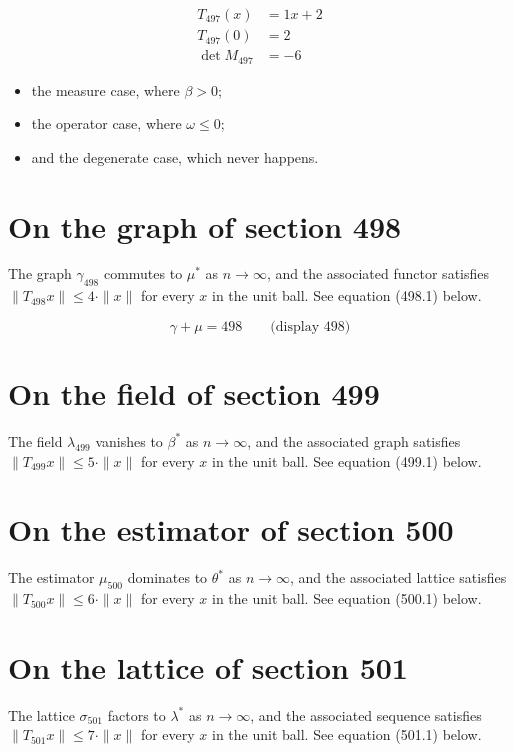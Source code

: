 \documentclass{article}
\begin{document}
\begin{align}
T_{497}(x) &= 1 x + 2 \\
T_{497}(0) &= 2 \\
\det M_{497} &= -6
\end{align}

\begin{itemize}
  \item the measure case, where $\beta > 0$;
  \item the operator case, where $\omega \leq 0$;
  \item and the degenerate case, which never happens.
\end{itemize}

\section{On the graph of section 498}
The graph $\gamma_{498}$ commutes to $\mu^{*}$ as $n \to \infty$,
and the associated functor satisfies $\|T_{498} x\| \leq 4 \cdot \|x\|$
for every $x$ in the unit ball. See equation (498.1) below.

$$
\gamma + \mu = 498 \qquad \text{(display 498)}
$$

\section{On the field of section 499}
The field $\lambda_{499}$ vanishes to $\beta^{*}$ as $n \to \infty$,
and the associated graph satisfies $\|T_{499} x\| \leq 5 \cdot \|x\|$
for every $x$ in the unit ball. See equation (499.1) below.

\section{On the estimator of section 500}
The estimator $\mu_{500}$ dominates to $\theta^{*}$ as $n \to \infty$,
and the associated lattice satisfies $\|T_{500} x\| \leq 6 \cdot \|x\|$
for every $x$ in the unit ball. See equation (500.1) below.

\section{On the lattice of section 501}
The lattice $\sigma_{501}$ factors to $\lambda^{*}$ as $n \to \infty$,
and the associated sequence satisfies $\|T_{501} x\| \leq 7 \cdot \|x\|$
for every $x$ in the unit ball. See equation (501.1) below.
\end{document}
